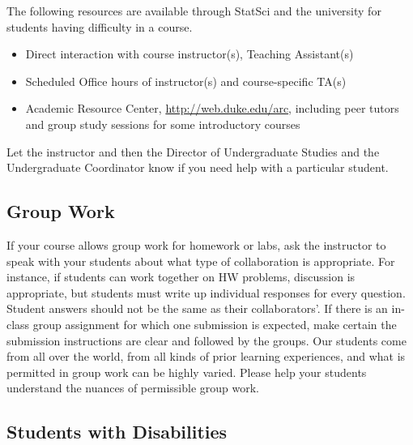 \documentclass[
]{article}
\providecommand{\tightlist}{%
  \setlength{\itemsep}{0pt}\setlength{\parskip}{0pt}}
\begin{document}
The following resources are available through StatSci and the university for students having difficulty in a course.

\begin{itemize}
\tightlist
\item
  Direct interaction with course instructor(s), Teaching Assistant(s)
\item
  Scheduled Office hours of instructor(s) and course-specific TA(s)
\item
  Academic Resource Center, \url{http://web.duke.edu/arc}, including peer tutors and group study sessions for some introductory courses
\end{itemize}

Let the instructor and then the Director of Undergraduate Studies and the Undergraduate Coordinator know if you need help with a particular student.

\hypertarget{group-work}{%
\subsection{Group Work}\label{group-work}}

If your course allows group work for homework or labs, ask the instructor to speak with your students about what type of collaboration is appropriate. For instance, if students can work together on HW problems, discussion is appropriate, but students must write up individual responses for every question. Student answers should not be the same as their collaborators'. If there is an in-class group assignment for which one submission is expected, make certain the submission instructions are clear and followed by the groups. Our students come from all over the world, from all kinds of prior learning experiences, and what is permitted in group work can be highly varied. Please help your students understand the nuances of permissible group work.

\hypertarget{students-with-disabilities}{%
\subsection{Students with Disabilities}\label{students-with-disabilities}}
\end{document}
